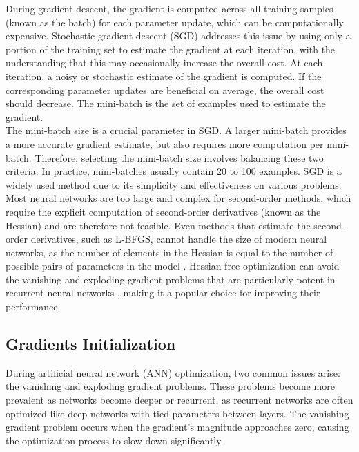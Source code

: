 \noindent During gradient descent, the gradient is computed across all training samples (known as the batch) for each parameter update, which can be computationally expensive. Stochastic gradient descent (SGD) addresses this issue by using only a portion of the training set to estimate the gradient at each iteration, with the understanding that this may occasionally increase the overall cost. At each iteration, a noisy or stochastic estimate of the gradient is computed. If the corresponding parameter updates are beneficial on average, the overall cost should decrease. The mini-batch is the set of examples used to estimate the gradient. \\

\noindent The mini-batch size is a crucial parameter in SGD. A larger mini-batch provides a more accurate gradient estimate, but also requires more computation per mini-batch. Therefore, selecting the mini-batch size involves balancing these two criteria. In practice, mini-batches usually contain 20 to 100 examples. SGD is a widely used method due to its simplicity and effectiveness on various problems. \\

\noindent Most neural networks are too large and complex for second-order methods, which require the explicit computation of second-order derivatives (known as the Hessian) and are therefore not feasible. Even methods that estimate the second-order derivatives, such as L-BFGS, cannot handle the size of modern neural networks, as the number of elements in the Hessian is equal to the number of possible pairs of parameters in the model \cite{liu1989limited}. Hessian-free optimization can avoid the vanishing and exploding gradient problems that are particularly potent in recurrent neural networks \cite{martens2010deep}, making it a popular choice for improving their performance.

\subsection[Gradients Initialization]{Gradients Initialization}

During artificial neural network (ANN) optimization, two common issues arise: the vanishing and exploding gradient problems. These problems become more prevalent as networks become deeper or recurrent, as recurrent networks are often optimized like deep networks with tied parameters between layers. The vanishing gradient problem occurs when the gradient's magnitude approaches zero, causing the optimization process to slow down significantly. \\

